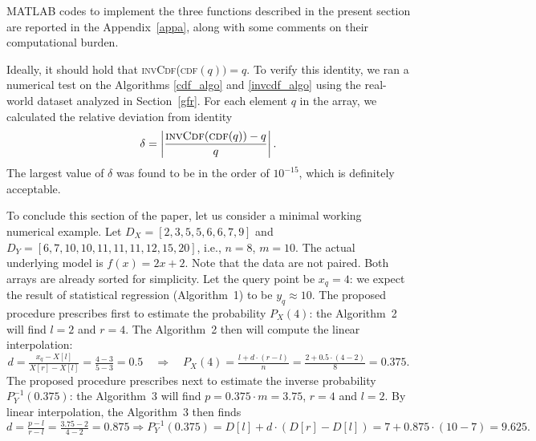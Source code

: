 \documentclass[10pt,final]{siamltex}
\begin{document}
MATLAB codes to implement the three functions described in the present section are reported in the Appendix~\ref{appa}, along with some comments on their computational burden.

Ideally, it should hold that \textsc{invCdf}(\textsc{cdf}$(q))=q$. To verify this identity, we ran a numerical test on the Algorithms \ref{cdf_algo} and \ref{invcdf_algo} using the real-world dataset analyzed in Section~\ref{gfr}. For each element $q$ in the array, we calculated the relative deviation from identity
%
\begin{equation}
  \delta = \left|\frac{\ensuremath{\textsc{invCdf}(\textsc{cdf}}(q)) - q}{q}\right|.
\end{equation}
%
The largest value of $\delta$ was found to be in the order of $10^{-15}$, which is definitely acceptable. %


To conclude this section of the paper, let us consider a minimal working numerical example. Let $D_X=[2,3,5,5,6,6,7,9]$ and $D_Y=[6,7,10,10,11,11,11,12,15,20]$, i.e., $n=8$, $m=10$. The actual underlying model is $f(x)=2x+2$. Note that the data are not paired. Both arrays are already sorted for simplicity. Let the query point be $x_q=4$: we expect the result of statistical regression (Algorithm~1) to be $y_q\approx10$. The proposed procedure prescribes first to estimate the probability $P_X(4)$: the Algorithm~2 will find $l=2$ and $r=4$. The Algorithm~2 then will compute the linear interpolation:
%
\begin{equation*}
  d = \tfrac{x_q-X[l]}{X[r]-X[l]} = \tfrac{4-3}{5-3} = 0.5 \quad\Rightarrow\quad
  P_X(4)=\tfrac{l+d\cdot(r-l)}{n}=\tfrac{2+0.5\cdot(4-2)}{8}=0.375.
\end{equation*}
%
The proposed procedure prescribes next to estimate the inverse probability $P^{-1}_Y(0.375)$: the Algorithm~3 will find $p = 0.375\cdot m=3.75$, $r=4$ and $l=2$. By linear interpolation, the Algorithm~3 then finds
%
\begin{equation*}
  d = \tfrac{p-l}{r-l} = \tfrac{3.75-2}{4-2} = 0.875 \Rightarrow
  P^{-1}_Y(0.375)=D[l]+d\cdot(D[r]-D[l])=7+0.875\cdot(10-7)=9.625.
\end{equation*}
%
%
\end{document}

